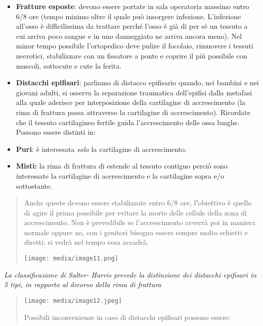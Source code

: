 \documentclass[]{article}
\begin{document}
\begin{itemize}
\item
  \textbf{Fratture esposte}: devono essere portate in sala operatoria
  massimo entro 6/8 ore (tempo minimo oltre il quale può insorgere
  infezione. L'infezione all'osso è difficilissima da trattare perché
  l'osso è già di per sé un tessuto a cui arriva poco sangue e in uno
  danneggiato ne arriva ancora meno). Nel minor tempo possibile
  l'ortopedico deve pulire il focolaio, rimuovere i tessuti necrotici,
  stabilizzare con un fissatore a ponte e coprire il più possibile con
  muscoli, sottocute e cute la ferita.
\item
  \textbf{Distacchi epifisari}: parliamo di distacco epifisario quando,
  nei bambini e nei giovani adulti, si osserva la separazione traumatica
  dell'epifisi dalla metafasi alla quale aderisce per interposizione
  della cartilagine di accrescimento (la rima di frattura passa
  attraverso la cartilagine di accrescimento). Ricordate che il tessuto
  cartilagineo fertile guida l'accrescimento delle ossa lunghe. Possono
  essere distinti in:
\end{itemize}

\begin{itemize}
\item
  \textbf{Puri}: è interessata \emph{solo} la cartilagine di
  accrescimento.
\item
  \textbf{Misti:} la rima di frattura di estende al tessuto contiguo
  perciò sono interessate la cartilagine di accrescimento e la
  cartilagine sopra e/o sottostante.
\end{itemize}

\begin{quote}
Anche queste devono essere stabilizzate entro 6/8 ore,
l\textbf{'}obiettivo è quello di agire il prima possibile per evitare la
morte delle cellule della zona di accrescimento. Non è prevedibile se
l'accrescimento avverrà poi in maniera normale oppure no, con i genitori
bisogna essere sempre molto schietti e diretti: si vedrà nel tempo cosa
accadrà.

\texttt{[image: media/image11.png]}
\end{quote}

\emph{La classificazione di Salter- Harris prevede la distinzione dei
distacchi epifisari in 5 tipi, in rapporto al decorso della rima di
frattura}

\begin{quote}
\texttt{[image: media/image12.jpeg]}

Possibili inconvenienze in caso di distacchi epifisari possono essere:
\end{quote}
\end{document}
